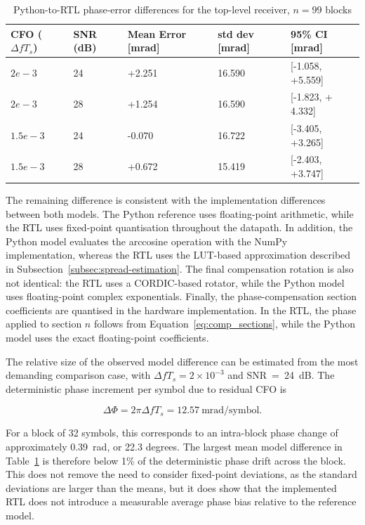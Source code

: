 \begin{table}[H]
\centering
\caption{Python-to-RTL phase-error differences for the top-level receiver, \(n=99\) blocks}
\label{tab:model-differences}
\begin{tabular}{lllll}
\hline
CFO ($\Delta f T_s$) & SNR (dB) & Mean Error {[}mrad{]} & std dev {[}mrad{]} & 95\% CI {[}mrad{]}    \\ \hline
$2e-3$               & 24       & +2.251                & 16.590             & {[}-1.058, +5.559{]}  \\
$2e-3$               & 28       & +1.254                & 16.590             & {[}-1.823, + 4.332{]} \\
$1.5e-3$             & 24       & -0.070                & 16.722             & {[}-3.405, +3.265{]}  \\
$1.5e-3$             & 28       & +0.672                & 15.419             & {[}-2.403, +3.747{]}
\end{tabular}
\end{table}

The remaining difference is consistent with the implementation differences between both models. The Python reference uses floating-point arithmetic, while the \ac{RTL} uses fixed-point quantisation throughout the datapath. In addition, the Python model evaluates the arccosine operation with the NumPy implementation, whereas the \ac{RTL} uses the \ac{LUT}-based approximation described in Subsection~\ref{subsec:spread-estimation}. The final compensation rotation is also not identical: the \ac{RTL} uses a CORDIC-based rotator, while the Python model uses floating-point complex exponentials. Finally, the phase-compensation section coefficients are quantised in the hardware implementation. In the \ac{RTL}, the phase applied to section \(n\) follows
from Equation~\ref{eq:comp_sections}, while the Python model uses the exact floating-point coefficients.

The relative size of the observed model difference can be estimated from the most demanding comparison case, with $\Delta f T_s = 2\times10^{-3}$ and \ac{SNR}~=~24~dB. The deterministic phase increment per symbol due to residual \ac{CFO} is

\begin{equation}
    \Delta \Phi  = 2\pi\Delta f T_s = 12.57~\text{mrad/symbol}.
\end{equation}

For a block of 32 symbols, this corresponds to an intra-block phase change of approximately 0.39~rad, or 22.3 degrees. The largest mean model difference in Table~\ref{tab:model-differences} is therefore below 1\% of the deterministic phase drift across the block. This does not remove the need to consider fixed-point deviations, as the standard deviations are larger than the means, but it does show that the implemented \ac{RTL} does not introduce a measurable average phase bias relative to the reference model.

